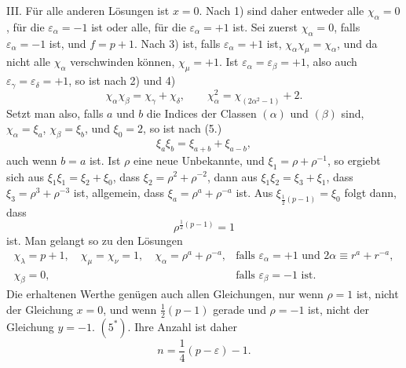 \documentclass[11pt]{article}
\begin{document}
III. Für alle anderen Lösungen ist $x=0$. Nach 1) sind daher entweder alle $\chi_\alpha=0$, für die $\varepsilon_\alpha=-1$ ist oder alle, für die $\varepsilon_\alpha=+1$ ist. Sei zuerst $\chi_\alpha=0$, falls $\varepsilon_\alpha=-1$ ist, und $f=p+1$. Nach 3) ist, falls $\varepsilon_\alpha=+1$ ist, $\chi_\alpha\chi_\mu=\chi_\alpha$, und da nicht alle $\chi_\alpha$ verschwinden können, $\chi_\mu=+1$. Ist $\varepsilon_\alpha=\varepsilon_\beta=+1$, also auch $\varepsilon_\gamma=\varepsilon_\delta=+1$, so ist nach 2) und 4)
\[
\chi_\alpha\chi_\beta=\chi_\gamma+\chi_\delta,\qquad
\chi_\alpha^2=\chi_{(2\alpha^2-1)}+2.
\]
Setzt man also, falls $a$ und $b$ die Indices der Classen $(\alpha)$ und $(\beta)$ sind, $\chi_\alpha=\xi_a$, $\chi_\beta=\xi_b$, und $\xi_0=2$, so ist nach (5.)
\[
\xi_a\xi_b=\xi_{a+b}+\xi_{a-b},
\]
auch wenn $b=a$ ist. Ist $\rho$ eine neue Unbekannte, und $\xi_1=\rho+\rho^{-1}$, so ergiebt sich aus $\xi_1\xi_1=\xi_2+\xi_0$, dass $\xi_2=\rho^2+\rho^{-2}$, dann aus $\xi_1\xi_2=\xi_3+\xi_1$, dass $\xi_3=\rho^3+\rho^{-3}$ ist, allgemein, dass $\xi_a=\rho^a+\rho^{-a}$ ist. Aus $\xi_{\frac12(p-1)}=\xi_0$ folgt dann, dass
\begin{equation*}\tag{9.}
\rho^{\frac12(p-1)}=1
\end{equation*}
ist. Man gelangt so zu den Lösungen
\[
\begin{array}{ll}
\chi_\lambda=p+1,\quad \chi_\mu=\chi_\nu=1,\quad
\chi_\alpha=\rho^a+\rho^{-a},&
\text{falls }\varepsilon_\alpha=+1\text{ und }2\alpha\equiv r^a+r^{-a},\\
\chi_\beta=0,&
\text{falls }\varepsilon_\beta=-1\text{ ist.}
\end{array}
\]
Die erhaltenen Werthe genügen auch allen Gleichungen, nur wenn $\rho=1$ ist, nicht der Gleichung $x=0$, und wenn $\frac12(p-1)$ gerade und $\rho=-1$ ist, nicht der Gleichung $y=-1$. $(5^*)$. Ihre Anzahl ist daher
\begin{equation*}\tag{10.}
n=\frac14(p-\varepsilon)-1.
\end{equation*}
\end{document}
